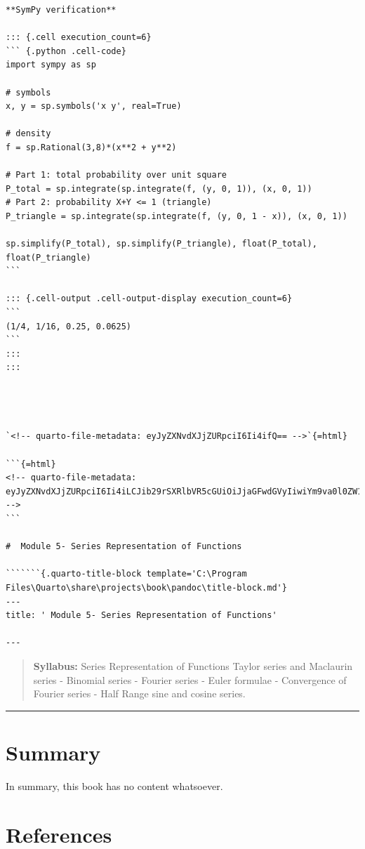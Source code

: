 \documentclass[
  letterpaper,
  DIV=11,
  numbers=noendperiod]{scrreprt}
\begin{document}
\begin{verbatim}
**SymPy verification**

::: {.cell execution_count=6}
``` {.python .cell-code}
import sympy as sp

# symbols
x, y = sp.symbols('x y', real=True)

# density
f = sp.Rational(3,8)*(x**2 + y**2)

# Part 1: total probability over unit square
P_total = sp.integrate(sp.integrate(f, (y, 0, 1)), (x, 0, 1))
# Part 2: probability X+Y <= 1 (triangle)
P_triangle = sp.integrate(sp.integrate(f, (y, 0, 1 - x)), (x, 0, 1))

sp.simplify(P_total), sp.simplify(P_triangle), float(P_total), float(P_triangle)
```

::: {.cell-output .cell-output-display execution_count=6}
```
(1/4, 1/16, 0.25, 0.0625)
```
:::
:::




`<!-- quarto-file-metadata: eyJyZXNvdXJjZURpciI6Ii4ifQ== -->`{=html}

```{=html}
<!-- quarto-file-metadata: eyJyZXNvdXJjZURpciI6Ii4iLCJib29rSXRlbVR5cGUiOiJjaGFwdGVyIiwiYm9va0l0ZW1OdW1iZXIiOjYsImJvb2tJdGVtRmlsZSI6Im1vZHVsZTUucW1kIiwiYm9va0l0ZW1EZXB0aCI6MH0= -->
```

#  Module 5- Series Representation of Functions 

```````{.quarto-title-block template='C:\Program Files\Quarto\share\projects\book\pandoc\title-block.md'}
---
title: ' Module 5- Series Representation of Functions'

---
\end{verbatim}

\begin{quote}
\textbf{Syllabus:} Series Representation of Functions Taylor series and
Maclaurin series - Binomial series - Fourier series - Euler formulae -
Convergence of Fourier series - Half Range sine and cosine series.
\end{quote}

\begin{center}\rule{0.5\linewidth}{0.5pt}\end{center}


\chapter{Summary}\label{summary}

In summary, this book has no content whatsoever.


\chapter*{References}\label{references}


\label{refs}
\end{document}
